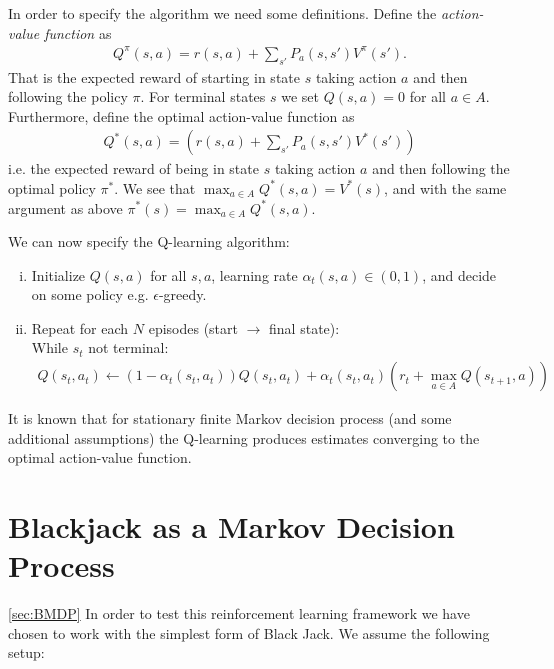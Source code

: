 In order to specify the algorithm we need some definitions. Define the \textit{action-value function} as
\begin{align} \label{eq:Qfun_policy}
	Q^{\pi} ( s,a  ) = r(s,a) + \sum_{s'} P_{a}(s,s')V^{\pi}(s').
\end{align}
That is the expected reward of starting in state $s$ taking action $a$ and then following the policy $\pi$. For terminal states $s$ we set $Q(s,a)=0$ for all $a\in A$. Furthermore, define the optimal action-value function as
\begin{align} \label{eq:Qfun_optimal}
Q^*  ( s,a  ) =  (r(s,a) + \sum_{s'} P_{a}(s,s')V^{* }(s'))
\end{align}
i.e. the expected reward of being in state $s$ taking action $a$ and then following the optimal policy $\pi^*$. We see that $\max_{a \in A} Q^*(s,a) = V^*(s)$, and 
with the same argument as above $\pi^*(s) = \max_{a \in A}Q^*(s,a)$. 

We can now specify the Q-learning algorithm:

\begin{enumerate}[(i)]
	\item Initialize $Q(s,a)$ for all $s,a$, learning rate $\alpha_t(s,a) \in (0,1)$, and decide on some policy e.g. $\epsilon$-greedy.
	\item Repeat for each $N$ episodes (start $\to$ final state): \\
	While $s_t$ not terminal:  
	\begin{align} \label{eq:Qupdate}
          Q(s_t,a_t)  \leftarrow (1-\alpha_t(s_t,a_t))Q(s_t,a_t) + \alpha_t(s_t,a_t)( r_t + \max_{a \in A} Q(s_{t+1},a) )
        \end{align}
\end{enumerate}
It is known that for stationary finite Markov decision process (and some additional assumptions) the Q-learning produces estimates converging to the optimal action-value function.


\section*{Blackjack as a Markov Decision Process}\ref{sec:BMDP}
In order to test this reinforcement learning framework we have chosen to work with the simplest form of Black Jack. We assume the following setup:

